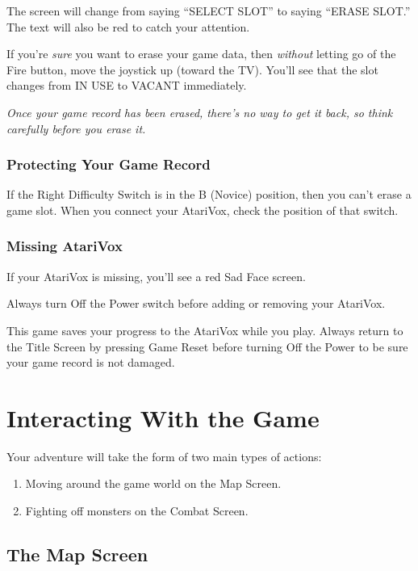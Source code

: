 \documentclass[12pt,twoside]{memoir}
\begin{document}
The screen will change from saying ``SELECT SLOT'' to saying ``ERASE
SLOT.'' The text will also be red to catch your attention.

If  you're  \emph{sure}   you  want  to  erase  your   game  data,  then
\emph{without}  letting go  of the  Fire  button, move  the joystick  up
(toward  the TV).  You'll  see that  the  slot changes  from  IN USE  to
VACANT immediately.

\emph{Once your  game record has been  erased, there's no way  to get it
  back, so think carefully before you erase it.}

\subsection{Protecting Your Game Record}

If the Right  Difficulty Switch is in the B  (Novice) position, then you
can't  erase a  game slot.  When you  connect your  AtariVox, check  the
position of that switch.

\subsection{Missing AtariVox}

If your AtariVox is missing, you'll see a red Sad Face screen.

Always   turn  Off   the  Power   switch  before   adding  or   removing
your AtariVox.

This  game  saves  your  progress   to  the  AtariVox  while  you  play.
Always return to the Title Screen  by pressing Game Reset before turning
Off the Power to be sure your game record is not damaged.

\chapter{Interacting With the Game}

Your adventure will take the form of two main types of actions:

\begin{enumerate}
\item Moving around the game world on the Map Screen.
\item Fighting off monsters on the Combat Screen.
\end{enumerate}

\section{The Map Screen}
\end{document}
